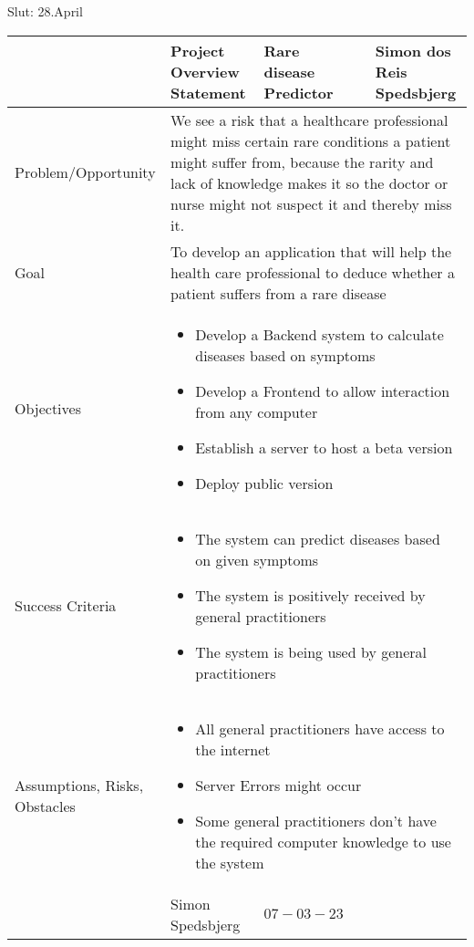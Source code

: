 Slut: 28.April
\begin{center}
	\begin{tabular}[h]{|p{7em}|p{5em}|p{5em}|p{5em}|p{5em}|}
		\hline
		& {\scriptsize Project Overview Statement} & {\scriptsize Rare disease Predictor} & & {\scriptsize Simon dos Reis Spedsbjerg} \\ \hline
		{\scriptsize Problem/Opportunity} & \multicolumn{4}{|p{20em}|}{\scriptsize We see a risk that a healthcare professional might miss certain rare conditions a patient might suffer from, because the rarity and lack of knowledge makes it so the doctor or nurse might not suspect it and thereby miss it.}\\ \hline
		{\scriptsize Goal} & \multicolumn{4}{|p{20em}|}{\scriptsize To develop an application that will help the health care professional to deduce whether a patient suffers from a rare disease}\\ \hline
		{\scriptsize Objectives} & \multicolumn{4}{|p{20em}|}{\scriptsize \begin{itemize}
		\item Develop a Backend system to calculate diseases based on symptoms
		\item Develop a Frontend to allow interaction from any computer
		\item Establish a server to host a beta version
		\item Deploy public version
			 \end{itemize}
		 } \\ \hline
	 {\scriptsize Success Criteria} & \multicolumn{4}{|p{20em}|}{\scriptsize\begin{itemize}
	 	\item The system can predict diseases based on given symptoms
	 	\item The system is positively received by general practitioners
	 	\item The system is being used by general practitioners
	 \end{itemize}} \\ \hline
 	{\scriptsize Assumptions, Risks, Obstacles} & \multicolumn{4}{|p{20em}|}{\scriptsize
 	\begin{itemize}
 		\item All general practitioners have access to the internet
 		\item Server Errors might occur
 		\item Some general practitioners don't have the required computer knowledge to use the system
 	\end{itemize}	
 }\\ \hline
& {\scriptsize Simon Spedsbjerg} & {\scriptsize $07-03-23$} & & \\ \hline
	\end{tabular}
\end{center}

